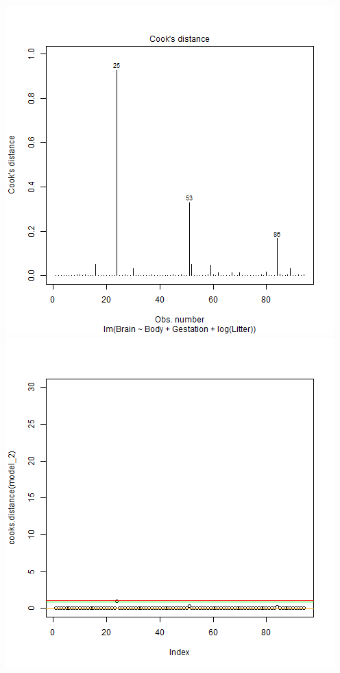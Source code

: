 \documentclass[12pt,a4paper]{article}
\begin{document}
\begin{center}
\includegraphics[scale= 0.6]{3_b_1.png}\\
\includegraphics[scale=0.6]{3_b_2.png}\\

\end{center}
\end{document}
